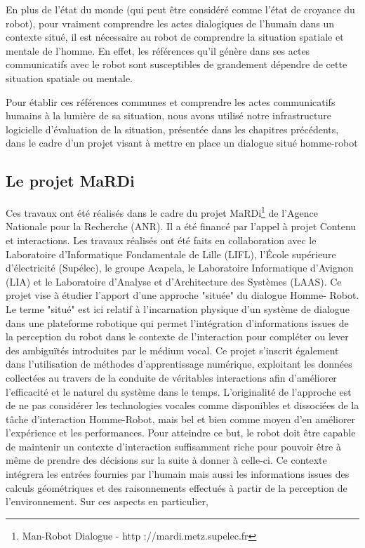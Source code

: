 \documentclass[a4paper,11pt,twoside]{StyleThese}
\begin{document}
En plus de l'état du monde (qui peut être considéré comme l'état de croyance du robot), pour vraiment comprendre les actes dialogiques de l'humain dans un contexte situé, il est nécessaire au robot de comprendre la situation spatiale et mentale de l'homme. En effet, les références qu'il génère dans ses actes communicatifs avec le robot sont susceptibles de grandement dépendre de cette situation spatiale ou mentale.

Pour établir ces références communes et comprendre les actes communicatifs humains à la lumière de sa situation, nous avons utilisé notre infrastructure logicielle d'évaluation de la situation, présentée dans les chapitres précédents, dans le cadre d'un projet visant à mettre en place un dialogue situé homme-robot


\subsection{Le projet MaRDi}
Ces travaux ont été réalisés dans le cadre du projet MaRDi\footnote{Man-Robot Dialogue - http ://mardi.metz.supelec.fr
} de l’Agence Nationale pour la Recherche (ANR). Il a été financé par l’appel à projet Contenu et interactions. Les
travaux réalisés ont été faits en collaboration avec le Laboratoire d’Informatique Fondamentale de Lille (LIFL), l’École supérieure d’électricité (Supélec), le groupe Acapela, le Laboratoire Informatique d’Avignon (LIA) et le Laboratoire d’Analyse et d’Architecture des Systèmes (LAAS).
Ce projet vise à étudier l’apport d’une approche "située" du dialogue Homme-
Robot. Le terme "situé" est ici relatif à l’incarnation physique d’un système de dialogue dans une plateforme robotique qui permet l’intégration d’informations issues de la perception du robot dans le contexte de l’interaction pour compléter ou lever des ambiguïtés introduites par le médium vocal. Ce projet s’inscrit également dans l’utilisation de méthodes d’apprentissage numérique, exploitant les données collectées au travers de la conduite de véritables interactions afin d’améliorer l’efficacité et le naturel du système dans le temps. L’originalité de l’approche est de ne pas considérer les technologies vocales comme disponibles et dissociées de la tâche d’interaction Homme-Robot, mais bel et bien comme moyen d’en améliorer l’expérience et les performances.
Pour atteindre ce but, le robot doit être capable de maintenir un contexte d’interaction suffisamment riche pour pouvoir être à même de prendre des décisions sur la suite à donner à celle-ci. Ce contexte intégrera les entrées fournies par l’humain mais aussi les informations issues des calculs géométriques et des raisonnements effectués à partir de la perception de l’environnement. Sur ces aspects en particulier,
\end{document}
